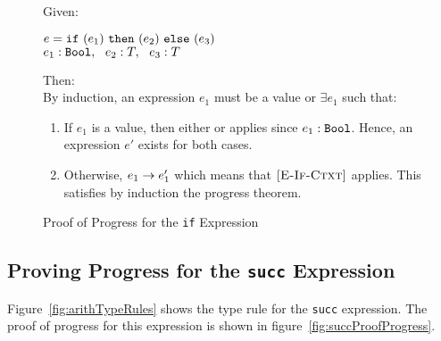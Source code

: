 \documentclass{report}
\newcommand{\rel}[1]{\mbox{\sc [#1]}}
\begin{document}
\begin{figure}[ht!]
Given:

\begin{center}
   $e = \mbox{\tt if}~({e_1})~\mbox{\tt then}~({e_2})~\mbox{\tt else}~({e_3})$\\
   ${e_1} : {\mbox{\tt Bool}},~~{e_2} : {T},~~{e_3} : {T}$
\end{center}

Then:~\\

By induction, an expression $e_1$ must be a value or $\exists e_1$ such that:
\begin{enumerate}

    \item If $e_1$ is a value, then either \rel{E-If-True} or \rel{E-If-False} applies since ${e_1} : {\mbox{\tt Bool}}$.  Hence, an expression $e'$ exists for both cases.
      
    \item Otherwise, ${e_1} \rightarrow {e'_1}$ which means that $\rel{E-If-Ctxt}$ applies.  This satisfies by induction the progress theorem.
	
	\end{enumerate}
	
  \caption{Proof of Progress for the \texttt{if} Expression}\label{fig:ifProofProgress}
\end{figure}

\eject
\subsection{Proving Progress for the \texttt{succ} Expression}

Figure~\ref{fig:arithTypeRules} shows the type rule for the \texttt{succ} expression.  The proof of progress for this expression is shown in figure~\ref{fig:succProofProgress}.
\end{document}
